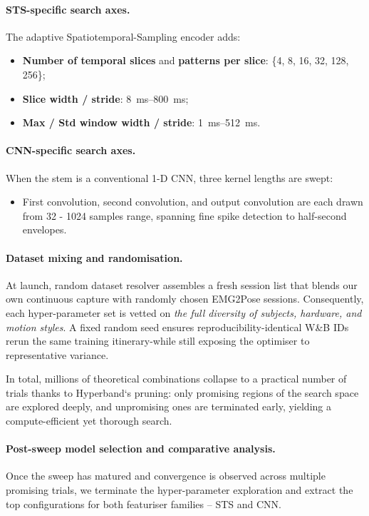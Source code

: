 \paragraph{STS-specific search axes.}
The adaptive Spatiotemporal-Sampling encoder adds:

\begin{itemize}
  \item \textbf{Number of temporal slices} and \textbf{patterns per slice}:
        \{4, 8, 16, 32, 128, 256\};
  \item \textbf{Slice width / stride}: \SIrange{8}{800}{ms};
  \item \textbf{Max / Std window width / stride}:
        \SIrange{1}{512}{ms}.
\end{itemize}

\paragraph{CNN-specific search axes.}
When the stem is a conventional 1-D CNN, three kernel lengths are swept:

\begin{itemize}
  \item First convolution, second convolution, and output convolution are each
        drawn from 32 - 1024 samples range,
        spanning fine spike detection to half-second envelopes.
\end{itemize}

\paragraph{Dataset mixing and randomisation.}
At launch, random dataset resolver assembles a fresh session list that blends our own
continuous capture with randomly chosen EMG2Pose sessions.
Consequently, each hyper-parameter set is vetted on \emph{the full diversity of
subjects, hardware, and motion styles}.
A fixed random seed ensures reproducibility-identical W\&B IDs rerun the same
training itinerary-while still exposing the optimiser to representative
variance.

In total, millions of theoretical combinations collapse to a practical number
of trials thanks to Hyperband`s pruning: only promising regions of the search
space are explored deeply, and unpromising ones are terminated early, yielding
a compute-efficient yet thorough search.

\paragraph{Post-sweep model selection and comparative analysis.}
Once the sweep has matured and convergence is observed across multiple promising
trials, we terminate the hyper-parameter exploration and extract the top
configurations for both featuriser families -- STS and CNN.

